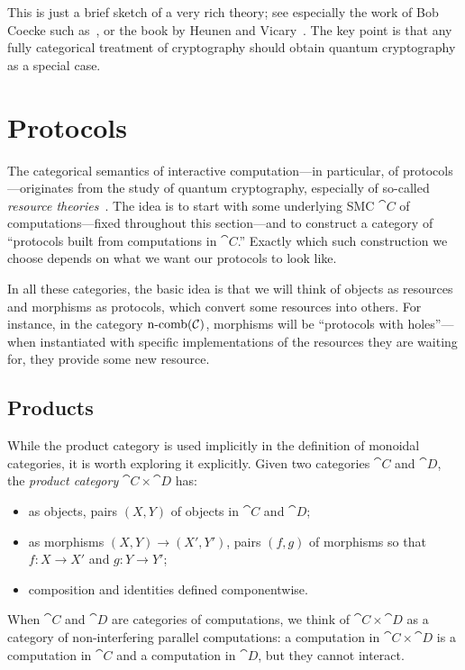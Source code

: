This is just a brief sketch of a very rich theory; see especially the work of
Bob Coecke such
as~\cite{abramsky-coecke-2004,coecke-perdrix-2012,coecke-kissinger-2017}, or the
book by Heunen and Vicary~\cite{heunen-vicary-2014}. The key point is that any
fully categorical treatment of cryptography should obtain quantum cryptography as
a special case.

\section{Protocols}

The categorical semantics of interactive computation---in particular, of
protocols---originates from the study of quantum cryptography, especially of
so-called \emph{resource theories}~\cite{coecke-2016}. The idea is to start with
some underlying SMC $\cat{C}$ of computations---fixed throughout this
section---and to construct a category of ``protocols built from computations in
$\cat{C}$.'' Exactly which such construction we choose depends on what we want
our protocols to look like.

In all these categories, the basic idea is that we will think of objects as
resources and morphisms as protocols, which convert some resources into others.
For instance, in the category $\operatorname*{n-comb}({\mathcal{C}})$, morphisms will be ``protocols with
holes''---when instantiated with specific implementations of the resources they
are waiting for, they provide some new resource.

\subsection{Products}

While the product category is used implicitly in the definition of monoidal
categories, it is worth exploring it explicitly. Given two categories $\cat{C}$
and $\cat{D}$, the \emph{product category} $\cat{C}\times\cat{D}$ has:
\begin{itemize}
  \item as objects, pairs $(X,Y)$ of objects in $\cat{C}$ and $\cat{D}$;
  \item as morphisms $(X,Y)\to (X',Y')$, pairs $(f,g)$ of morphisms so that $f:
    X\to X'$ and $g: Y\to Y'$;
  \item composition and identities defined componentwise.
\end{itemize}

When $\cat{C}$ and $\cat{D}$ are categories of computations, we think of
$\cat{C}\times\cat{D}$ as a category of non-interfering parallel computations: a
computation in $\cat{C}\times\cat{D}$ is a computation in $\cat{C}$ and a
computation in $\cat{D}$, but they cannot interact.


